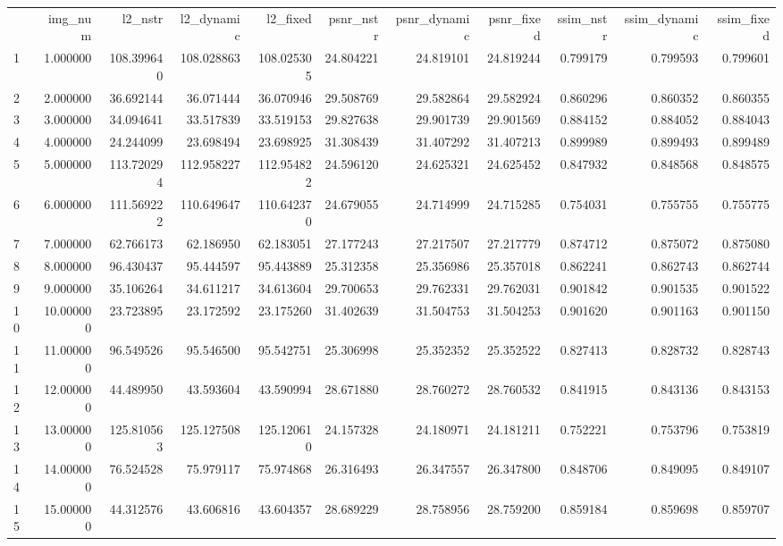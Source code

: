 \begin{tabular}{lrrrrrrrrrr}
 & img_num & l2_nstr & l2_dynamic & l2_fixed & psnr_nstr & psnr_dynamic & psnr_fixed & ssim_nstr & ssim_dynamic & ssim_fixed \\
1 & 1.000000 & 108.399640 & 108.028863 & 108.025305 & 24.804221 & 24.819101 & 24.819244 & 0.799179 & 0.799593 & 0.799601 \\
2 & 2.000000 & 36.692144 & 36.071444 & 36.070946 & 29.508769 & 29.582864 & 29.582924 & 0.860296 & 0.860352 & 0.860355 \\
3 & 3.000000 & 34.094641 & 33.517839 & 33.519153 & 29.827638 & 29.901739 & 29.901569 & 0.884152 & 0.884052 & 0.884043 \\
4 & 4.000000 & 24.244099 & 23.698494 & 23.698925 & 31.308439 & 31.407292 & 31.407213 & 0.899989 & 0.899493 & 0.899489 \\
5 & 5.000000 & 113.720294 & 112.958227 & 112.954822 & 24.596120 & 24.625321 & 24.625452 & 0.847932 & 0.848568 & 0.848575 \\
6 & 6.000000 & 111.569222 & 110.649647 & 110.642370 & 24.679055 & 24.714999 & 24.715285 & 0.754031 & 0.755755 & 0.755775 \\
7 & 7.000000 & 62.766173 & 62.186950 & 62.183051 & 27.177243 & 27.217507 & 27.217779 & 0.874712 & 0.875072 & 0.875080 \\
8 & 8.000000 & 96.430437 & 95.444597 & 95.443889 & 25.312358 & 25.356986 & 25.357018 & 0.862241 & 0.862743 & 0.862744 \\
9 & 9.000000 & 35.106264 & 34.611217 & 34.613604 & 29.700653 & 29.762331 & 29.762031 & 0.901842 & 0.901535 & 0.901522 \\
10 & 10.000000 & 23.723895 & 23.172592 & 23.175260 & 31.402639 & 31.504753 & 31.504253 & 0.901620 & 0.901163 & 0.901150 \\
11 & 11.000000 & 96.549526 & 95.546500 & 95.542751 & 25.306998 & 25.352352 & 25.352522 & 0.827413 & 0.828732 & 0.828743 \\
12 & 12.000000 & 44.489950 & 43.593604 & 43.590994 & 28.671880 & 28.760272 & 28.760532 & 0.841915 & 0.843136 & 0.843153 \\
13 & 13.000000 & 125.810563 & 125.127508 & 125.120610 & 24.157328 & 24.180971 & 24.181211 & 0.752221 & 0.753796 & 0.753819 \\
14 & 14.000000 & 76.524528 & 75.979117 & 75.974868 & 26.316493 & 26.347557 & 26.347800 & 0.848706 & 0.849095 & 0.849107 \\
15 & 15.000000 & 44.312576 & 43.606816 & 43.604357 & 28.689229 & 28.758956 & 28.759200 & 0.859184 & 0.859698 & 0.859707 \\

\end{tabular}

